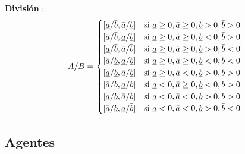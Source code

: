 \documentclass{article}
\begin{document}
\begin{flushleft}

\textbf{División }: \\

    \[
    A / B = 
    \begin{cases} 
    [\uline{a}/\bar{b}, \bar{a}/\uline{b}] & \text{si } \uline{a} \geq 0, \bar{a} \geq 0, \uline{b} > 0, \bar{b} > 0 \\
    [\bar{a}/\bar{b}, \uline{a}/\uline{b}] & \text{si } \uline{a} \geq 0, \bar{a} \geq 0, \uline{b} < 0, \bar{b} > 0 \\
    [\uline{a}/\bar{b}, \bar{a}/\bar{b}] & \text{si } \uline{a} \geq 0, \bar{a} \geq 0,   \uline{b} > 0, \bar{b} < 0 \\
    [\bar{a}/\uline{b}, \uline{a}/\uline{b}] & \text{si } \uline{a} \geq 0, \bar{a} \geq 0, \uline{b} < 0, \bar{b} < 0 \\
    [\uline{a}/\uline{b}, \bar{a}/\uline{b}] & \text{si } \uline{a} \geq 0, \bar{a} < 0, \uline{b} > 0, \bar{b} > 0 \\
    
    [\bar{a}/\bar{b}, \uline{a}/\bar{b}] & \text{si } \uline{a} < 0, \bar{a} \geq 0, \uline{b} < 0, \bar{b} > 0 \\
    
    [\uline{a}/\uline{b}, \bar{a}/\bar{b}] & \text{si } \uline{a} < 0, \bar{a} < 0, \uline{b} > 0, \bar{b} > 0 \\
    [\bar{a}/\uline{b}, \uline{a}/\bar{b}] & \text{si } \uline{a} < 0, \bar{a} < 0, \uline{b} > 0, \bar{b} < 0 \\
    \end{cases}
    \]
\end{flushleft} 

    \subsection*{ \Large Agentes}
\end{document}
